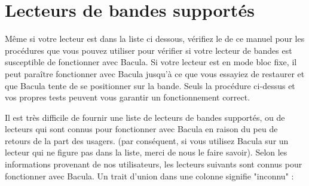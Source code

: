 
\chapter{Lecteurs de bandes support\'es}
\label{_ChapterStart19}

M\^eme si votre lecteur est dans la liste ci dessous, v\'erifiez le 
 de ce manuel
pour les proc\'edures que vous pouvez utiliser pour v\'erifier si votre
lecteur de bandes est susceptible de fonctionner avec Bacula. 
Si votre lecteur est en mode bloc
fixe, il peut para\^itre fonctionner avec Bacula jusqu'\`a ce que vous essayiez de
restaurer et que Bacula tente de se positionner sur la bande. Seuls la
proc\'edure ci-dessus et vos propres tests peuvent vous garantir un
fonctionnement correct. 

Il est tr\`es difficile de fournir une liste de lecteurs de bandes
support\'es, ou de lecteurs qui sont connus pour fonctionner avec Bacula en
raison du peu de retours de la part des usagers. (par cons\'equent, si vous
utilisez Bacula sur un lecteur qui ne figure pas dans la liste, merci de nous
le faire savoir). Selon les informations provenant de nos utilisateurs, les
lecteurs suivants sont connus pour fonctionner avec Bacula. Un trait d'union
dans une colonne signifie "inconnu" : 

